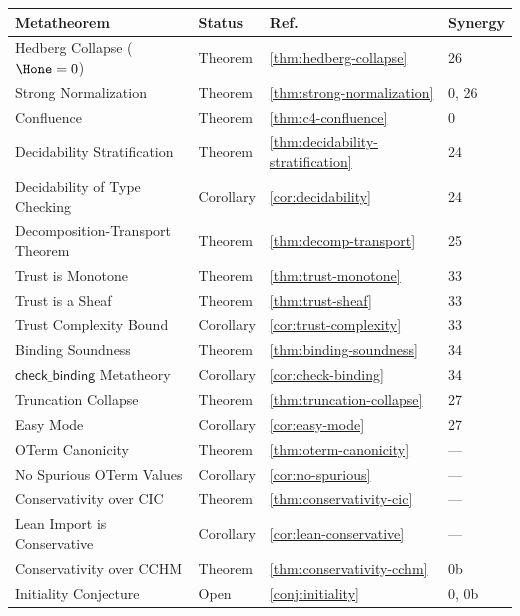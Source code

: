 \begin{center}
\renewcommand{\arraystretch}{1.35}
\begin{tabular}{p{5.5cm}lll}
\toprule
\textbf{Metatheorem} & \textbf{Status} & \textbf{Ref.} & \textbf{Synergy} \\
\midrule
Hedberg Collapse ($\Hone = 0$) & Theorem & \ref{thm:hedberg-collapse} & 26 \\
Strong Normalization & Theorem & \ref{thm:strong-normalization} & 0, 26 \\
Confluence & Theorem & \ref{thm:c4-confluence} & 0 \\
Decidability Stratification & Theorem & \ref{thm:decidability-stratification} & 24 \\
Decidability of Type Checking & Corollary & \ref{cor:decidability} & 24 \\
Decomposition-Transport Theorem & Theorem & \ref{thm:decomp-transport} & 25 \\
Trust is Monotone & Theorem & \ref{thm:trust-monotone} & 33 \\
Trust is a Sheaf & Theorem & \ref{thm:trust-sheaf} & 33 \\
Trust Complexity Bound & Corollary & \ref{cor:trust-complexity} & 33 \\
Binding Soundness & Theorem & \ref{thm:binding-soundness} & 34 \\
$\mathsf{check\_binding}$ Metatheory & Corollary & \ref{cor:check-binding} & 34 \\
Truncation Collapse & Theorem & \ref{thm:truncation-collapse} & 27 \\
Easy Mode & Corollary & \ref{cor:easy-mode} & 27 \\
OTerm Canonicity & Theorem & \ref{thm:oterm-canonicity} & --- \\
No Spurious OTerm Values & Corollary & \ref{cor:no-spurious} & --- \\
Conservativity over CIC & Theorem & \ref{thm:conservativity-cic} & --- \\
Lean Import is Conservative & Corollary & \ref{cor:lean-conservative} & --- \\
Conservativity over CCHM & Theorem & \ref{thm:conservativity-cchm} & 0b \\
Initiality Conjecture & Open & \ref{conj:initiality} & 0, 0b \\
\bottomrule
\end{tabular}
\end{center}
